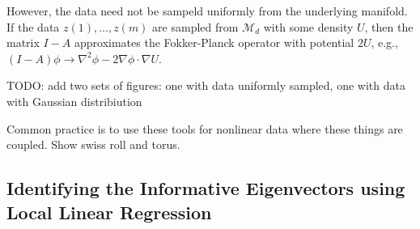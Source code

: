 \documentclass[preprint]{elsarticle}
\begin{document}
However, the data need not be sampeld uniformly from the underlying manifold.
%
If the data $z(1), \dots, z(m)$ are sampled from $\mathcal{M}_d$ with some density $U$, then the matrix $I-A$ approximates the Fokker-Planck operator with potential $2U$, e.g., $(I-A) \phi \rightarrow \nabla^2 \phi - 2\nabla\phi \cdot \nabla U$. 





TODO: add two sets of figures: one with data uniformly sampled, one with data with Gaussian distribiution

Common practice is to use these tools for nonlinear data where these things are coupled. Show swiss roll and torus.



\subsection{Identifying the Informative Eigenvectors using Local Linear Regression}
\end{document}
